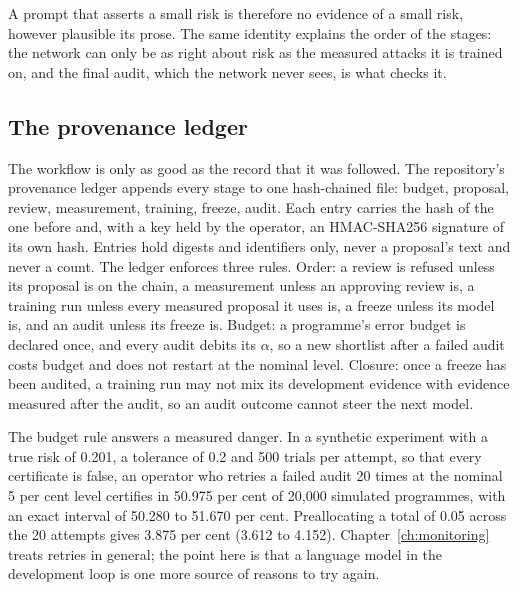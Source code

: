 A prompt that asserts a small risk is therefore no evidence of a small risk, however
plausible its prose. The same identity explains the order of the stages: the network
can only be as right about risk as the measured attacks it is trained on, and the
final audit, which the network never sees, is what checks it.

\subsection{The provenance ledger}

The workflow is only as good as the record that it was followed. The repository's
provenance ledger appends every stage to one hash-chained file:
budget, proposal, review, measurement, training, freeze, audit. Each entry carries the
hash of the one before and, with a key held by the operator, an HMAC-SHA256 signature
of its own hash. Entries hold digests and identifiers only, never a proposal's text
and never a count. The ledger enforces three rules. Order: a review is refused unless
its proposal is on the chain, a measurement unless an approving review is, a training
run unless every measured proposal it uses is, a freeze unless its model is, and an
audit unless its freeze is. Budget: a programme's error budget is declared once, and
every audit debits its $\alpha$, so a new shortlist after a failed audit costs budget
and does not restart at the nominal level. Closure: once a freeze has been audited, a
training run may not mix its development evidence with evidence measured after the
audit, so an audit outcome cannot steer the next model.

The budget rule answers a measured danger. In a synthetic experiment with a true risk
of 0.201, a tolerance of 0.2 and 500 trials per attempt, so that every certificate is
false, an operator who retries a failed audit 20 times at the nominal 5 per cent level
certifies in 50.975 per cent of 20{,}000 simulated programmes, with an exact interval of
50.280 to 51.670 per cent. Preallocating a total of 0.05 across the 20 attempts gives
3.875 per cent (3.612 to 4.152).
Chapter~\ref{ch:monitoring} treats retries in general; the point here is that a
language model in the development loop is one more source of reasons to try again.

